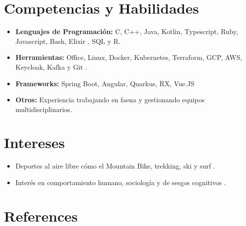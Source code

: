 \documentclass[11pt,letterpaper,sans]{moderncv}        %
\begin{document}
\section{Competencias y Habilidades}

\vspace{6pt}

\begin{itemize}

\item \textbf{Lenguajes de Programación:} C, C++, Java, Kotlin, Typescript,  Ruby, Javascript, Bash, Elixir , SQL y  R.
\vspace{6pt}

\item \textbf{Herramientas:} Office, Linux, Docker, Kubernetes, Terraform, GCP, AWS, Keycloak,  Kafka y Git .
\vspace{6pt}

\item \textbf{Frameworks:} Spring Boot, Angular, Quarkus, RX, Vue.JS
\vspace{6pt}

\item \textbf{Otros:} Experiencia trabajando en faena y gestionando equipos multidisciplinarios.

\end{itemize}

\section{Intereses}

\vspace{6pt}

\begin{itemize}

\item{Deportes al aire libre cómo el Mountain Bike, trekking, ski y  surf .}

\vspace{6pt}

\item{Interés en comportamiento humano, sociología y de sesgos cognitivos .}

\vspace{6pt}



\end{itemize}

\section{References}
\end{document}
